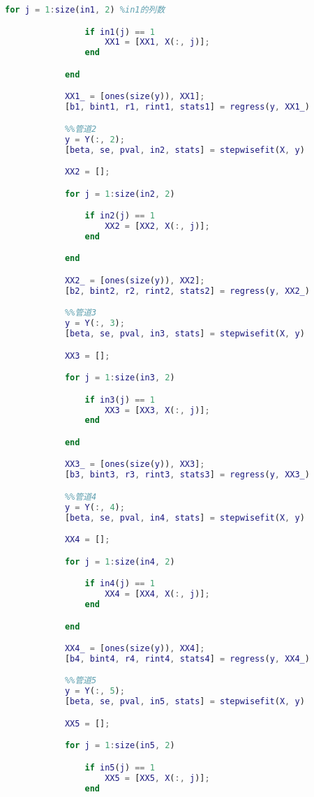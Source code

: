 \begin{appendices}
\begin{lstlisting}[language=matlab]
            for j = 1:size(in1, 2) %in1的列数

                if in1(j) == 1
                    XX1 = [XX1, X(:, j)];
                end

            end

            XX1_ = [ones(size(y)), XX1];
            [b1, bint1, r1, rint1, stats1] = regress(y, XX1_)

            %%管道2
            y = Y(:, 2);
            [beta, se, pval, in2, stats] = stepwisefit(X, y)

            XX2 = [];

            for j = 1:size(in2, 2)

                if in2(j) == 1
                    XX2 = [XX2, X(:, j)];
                end

            end

            XX2_ = [ones(size(y)), XX2];
            [b2, bint2, r2, rint2, stats2] = regress(y, XX2_)

            %%管道3
            y = Y(:, 3);
            [beta, se, pval, in3, stats] = stepwisefit(X, y)

            XX3 = [];

            for j = 1:size(in3, 2)

                if in3(j) == 1
                    XX3 = [XX3, X(:, j)];
                end

            end

            XX3_ = [ones(size(y)), XX3];
            [b3, bint3, r3, rint3, stats3] = regress(y, XX3_)

            %%管道4
            y = Y(:, 4);
            [beta, se, pval, in4, stats] = stepwisefit(X, y)

            XX4 = [];

            for j = 1:size(in4, 2)

                if in4(j) == 1
                    XX4 = [XX4, X(:, j)];
                end

            end

            XX4_ = [ones(size(y)), XX4];
            [b4, bint4, r4, rint4, stats4] = regress(y, XX4_)

            %%管道5
            y = Y(:, 5);
            [beta, se, pval, in5, stats] = stepwisefit(X, y)

            XX5 = [];

            for j = 1:size(in5, 2)

                if in5(j) == 1
                    XX5 = [XX5, X(:, j)];
                end


\end{lstlisting}
\end{appendices}
